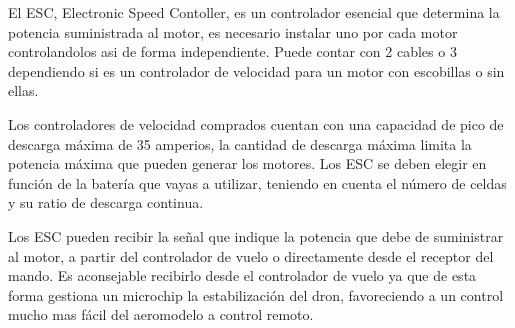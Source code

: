
 El ESC, Electronic Speed Contoller, es un controlador esencial que determina la potencia suministrada al motor, es necesario instalar uno por cada motor controlandolos asi de forma independiente. 
 Puede contar con 2 cables o 3 dependiendo si es un controlador de velocidad para un motor con escobillas o sin ellas.
 
 Los controladores de velocidad comprados cuentan con una capacidad de pico de descarga máxima de 35 amperios, la cantidad de descarga máxima limita la potencia máxima que pueden generar los motores. Los ESC se deben elegir en función de la batería que vayas a utilizar, teniendo en cuenta el número de celdas y su ratio de descarga continua.
 
 Los ESC pueden recibir la señal que indique la potencia que debe de suministrar al motor, a partir del controlador de vuelo o directamente desde el receptor del mando. Es aconsejable recibirlo desde el controlador de vuelo ya que de esta forma gestiona un microchip la estabilización del dron, favoreciendo a un control mucho mas fácil del aeromodelo a control remoto.\cite{OscarSerrano}

 